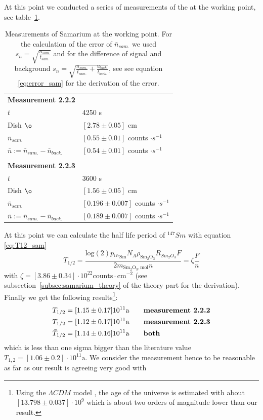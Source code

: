 At this point we conducted a series of measurements of the at the working point, see table~\ref{tab:mes1}.
\begin{table}
    \caption{Measurements of Samarium at the working point. For the calculation
    of the error of $\bar{n}_{sam.}$ we used $s_n = \sqrt{\frac{n_{sam.}}{t_{sam.}}}$ and for the difference
    of signal and background $s_n = \sqrt{\frac{n_{sam.}}{t_{sam.}}+\frac{u_{back.}}{t_{back.}} }$, see see equation \eqref{eq:error_sam} for
    the derivation of the error.}
    \begin{tabular}{l l}
        \textbf{Measurement 2.2.2} \\
        \rowcolor{tabcolor}$t$ & 4250 s \\ 
        Dish $\o$ & $\left [ 2.78 \pm 0.05 \right ]$ cm \\ 
        \rowcolor{tabcolor}$\bar{n}_{sam.}$ & $\left [ 0.55 \pm 0.01 \right ] $ counts $\cdot s^{-1}$ \\ 
    $\bar{n} := \bar{n}_{sam.} - \bar{n}_{back.}$ & $\left [ 0.54 \pm 0.01 \right ] $ counts $\cdot s^{-1}$ \\ \\
        \textbf{Measurement 2.2.3} \\
        \rowcolor{tabcolor}$t$ & 3600 s \\ 
        Dish $\o$ & $\left [ 1.56 \pm 0.05 \right ]$ cm \\ 
        \rowcolor{tabcolor}$\bar{n}_{sam.}$ & $\left [ 0.196 \pm 0.007 \right ] $ counts $\cdot s^{-1}$ \\ 
        $\bar{n} := \bar{n}_{sam.} - \bar{n}_{back.}$ & $\left [ 0.189 \pm 0.007 \right ] $ counts $\cdot s^{-1}$ \\ 
    \end{tabular}
    \label{tab:mes1}
\end{table}
At this point we can calculate the half life period of $^{147}Sm$ with equation \eqref{eq:T12_sam}
\begin{equation*}
T_{1/2} = \frac{\mathrm{log}(2)p_{\mathrm{^{147}Sm}} 
 N_A \rho_{\mathrm{Sm_2O_3}}R_{Sm_2O_3}F}{2m_{\mathrm{Sm_2O_3, mol}}n } = \zeta \frac{F}{n} 
\end{equation*}
with $\zeta=[3.86\pm0.34]\cdot10^{22} \mathrm{counts \cdot cm^{-2}}$
(see subsection~\ref{subsec:samarium_theory} of the theory part for the derivation). Finally we get the
following results\footnote{%
Using the $\Lambda CDM$ model \cite{Planck13}, 
the age of the universe is estimated with about $[13.798\pm0.037]\cdot 10^9$
which is about two orders of magnitude lower than our result. 
}:
\begin{align}
T_{1/2} &= [1.15\pm0.17]10^{11}\mathrm{a} \qquad \text{\textbf{measurement 2.2.2}}\\ 
T_{1/2} &= [1.12\pm0.17]10^{11}\mathrm{a} \qquad \text{\textbf{measurement 2.2.3}}\\
\bar{T}_{1/2} &= [1.14\pm0.16]10^{11}\mathrm{a} \qquad \text{\textbf{both}}
\end{align}
which is less than one sigma bigger than the literature value $T_{1,2} =[1.06\pm0.2]\cdot10^{11} \mathrm{a}$.
We consider the measurement hence to be reasonable as far as our result is agreeing very good with 
